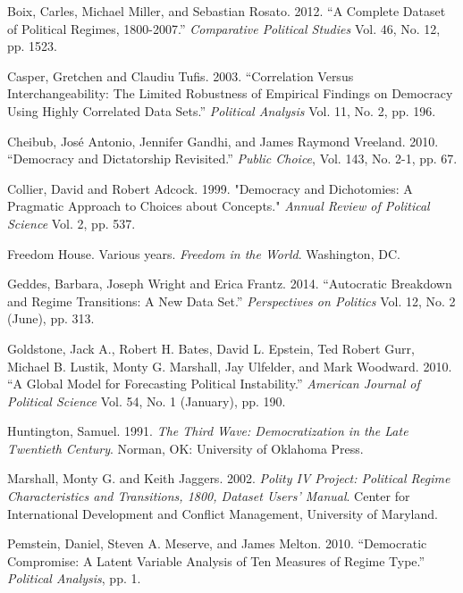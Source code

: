 \documentclass[letterpaper]{article}
\begin{document}
\begin{thebibliography}{1}

 Boix, Carles, Michael Miller, and Sebastian Rosato. 2012. “A Complete Dataset of Political Regimes, 1800-2007.” \textit{Comparative Political Studies} Vol. 46, No. 12, pp. 1523.

 Casper, Gretchen and Claudiu Tufis. 2003. “Correlation Versus Interchangeability: The Limited Robustness of Empirical Findings on Democracy Using Highly Correlated Data Sets.” \textit{Political Analysis} Vol. 11, No. 2, pp. 196.

 Cheibub, José Antonio, Jennifer Gandhi, and James Raymond Vreeland. 2010. “Democracy and Dictatorship Revisited.” \textit{Public Choice}, Vol. 143, No. 2-1, pp. 67.

 Collier, David and Robert Adcock. 1999. "Democracy and Dichotomies: A Pragmatic Approach to Choices about Concepts." \textit{Annual Review of Political Science} Vol. 2, pp. 537.

 Freedom House. Various years. \textit{Freedom in the World}. Washington, DC.

 Geddes, Barbara, Joseph Wright and Erica Frantz. 2014. “Autocratic Breakdown and Regime Transitions: A New Data Set.” \textit{Perspectives on Politics} Vol. 12, No. 2 (June), pp. 313.

 Goldstone, Jack A., Robert H. Bates, David L. Epstein, Ted Robert Gurr, Michael B. Lustik, Monty G. Marshall, Jay Ulfelder, and Mark Woodward. 2010. “A Global Model for Forecasting Political Instability.” \textit{American Journal of Political Science} Vol. 54, No. 1 (January), pp. 190.

 Huntington, Samuel. 1991. \textit{The Third Wave: Democratization in the Late Twentieth Century}. Norman, OK: University of Oklahoma Press.

 Marshall, Monty G. and Keith Jaggers. 2002. \textit{Polity IV Project: Political Regime Characteristics and Transitions, 1800, Dataset Users’ Manual}. Center for International Development and Conflict Management, University of Maryland.

 Pemstein, Daniel, Steven A. Meserve, and James Melton. 2010. “Democratic Compromise: A Latent Variable Analysis of Ten Measures of Regime Type.” \textit{Political Analysis}, pp. 1.


\end{thebibliography}
\end{document}
